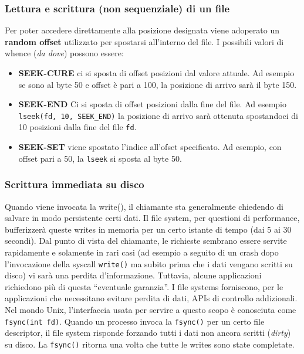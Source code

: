 \documentclass[12pt, twoside, letterpaper]{article}
\begin{document}
			\subsubsection{Lettura e scrittura (non sequenziale) di un file}
				Per poter accedere direttamente alla posizione designata viene adoperato un \textbf{random offset} utilizzato per spostarsi all'interno del file. I possibili valori di whence (\textit{da dove}) possono essere:
				\begin{itemize}
					\item \textbf{SEEK-CURE} ci si sposta di offset posizioni dal valore attuale. Ad esempio se sono al byte 50 e offset è pari a 100, la posizione di arrivo sarà il byte 150.
					\item \textbf{SEEK-END} Ci si sposta di offset posizioni dalla fine del file. Ad esempio \texttt{lseek(fd, 10, SEEK\_END)} la posizione di arrivo sarà ottenuta spostandoci di 10 posizioni dalla fine del file \texttt{fd}.
					\item \textbf{SEEK-SET} viene spostato l'indice all'ofset specificato. Ad esempio, con offset pari a 50, la \texttt{lseek} si sposta al byte 50.
				\end{itemize}
				
			\subsubsection{Scrittura immediata su disco}
				Quando viene invocata la write(), il chiamante sta generalmente chiedendo di salvare in modo persistente certi dati. Il file system, per questioni di performance, bufferizzerà queste writes in memoria per un certo istante di tempo (dai 5 ai 30 secondi). Dal punto di vista del chiamante, le richieste sembrano essere servite rapidamente e solamente in rari casi (ad esempio a seguito di un crash dopo l’invocazione della syscall \texttt{write()} ma subito prima che i dati vengano scritti su disco) vi sarà una perdita d’informazione. Tuttavia, alcune applicazioni richiedono più di questa “eventuale garanzia”. I file systems forniscono, per le applicazioni che necessitano evitare perdita di dati, APIs di controllo addizionali. Nel mondo Unix, l’interfaccia usata per servire a questo scopo è conosciuta come \texttt{fsync(int fd)}. Quando un processo invoca la \texttt{fsync()} per un certo file descriptor, il file system risponde forzando tutti i dati non ancora scritti (\textit{dirty}) su disco. La \texttt{fsync()} ritorna una volta che tutte le writes sono state completate.
				
\end{document}
